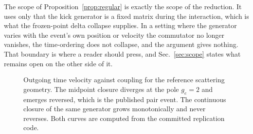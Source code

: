 \documentclass[aps,prd,reprint,nofootinbib]{revtex4-2}
\begin{document}
The scope of Proposition~\ref{prop:regular} is exactly the scope of the
reduction.  It uses only that the kick generator is a fixed matrix
during the interaction, which is what the frozen-point delta collapse
supplies.  In a setting where the generator varies with the event's
own position or velocity the commutator no longer vanishes, the
time-ordering does not collapse, and the argument gives nothing.  That
boundary is where a reader should press, and Sec.~\ref{sec:scope}
states what remains open on the other side of it.

\begin{figure}[t]
\centering
{}
\caption{Outgoing time velocity against coupling for the reference
scattering geometry.  The midpoint closure diverges at the pole
$g_{e} = 2$ and emerges reversed, which is the published pair event.
The continuous closure of the same generator grows monotonically and
never reverses.  Both curves are computed from the committed replication
code.}
\label{fig:prescriptions}
\end{figure}
\end{document}
